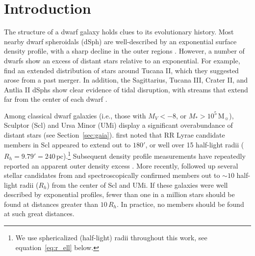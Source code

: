 \documentclass[linenumbers, twocolumn, twocolappendix]{aastex701}
\newcommand{\Mo}{\mathrm{M}_\sun}
\begin{document}




\section{Introduction\label{sec:intro}}

The  structure of a dwarf galaxy holds clues to its
evolutionary history.
Most nearby dwarf spheroidals (dSph) are well-described by an exponential
surface density profile, with a sharp decline in the outer regions \citep[e.g.,][]{mateo1998, mcconnachie+irwin2006, munoz+2018}. 
However, a number of dwarfs show an  excess of distant stars relative to an exponential.
For example, \citet{chiti+2021} find an extended distribution of stars around Tucana II, which they suggested arose from a past merger. In addition, the Sagittarius, Tucana III, Crater II, and Antlia II dSphs show clear evidence of tidal disruption, with streams that extend far from the center of each dwarf \citep[e.g.,][]{ibata+gilmore+irwin1994, li+2018, vivas+2022, ji2025}. 

Among classical dwarf galaxies (i.e., those with $M_V<-8$, or $M_*>10^5\, \Mo$),  Sculptor (Scl)  and Ursa Minor (UMi) display a significant overabundance of distant stars (see Section~\ref{sec:gaia}). \citet{innanen+papp1979} first noted that RR Lyrae candidate members in Scl appeared to extend out to $180'$, or well over 15 half-light radii ($R_h = 9.79' = 240\,\text{pc}$).\footnote{We use sphericalized (half-light) radii throughout this work, see equation~\ref{eq:r_ell} below.}
Subsequent density profile measurements have repeatedly reported  an apparent outer density excess \citep[e.g.,][]{eskridge1988, palma+2003, westfall+2006, sato+2025b}. 
More recently, \citet{sestito+2023a, sestito+2023b} followed up several stellar candidates from \cite{jensen+2024} and spectroscopically confirmed members out to ${\sim}10$ half-light radii ($R_h$) from the center of Scl and UMi. If these galaxies were well described by exponential profiles, fewer than one in a million stars should be found at distances greater than $10\,R_h$. In practice, no members should be found at such great distances. 
\end{document}
